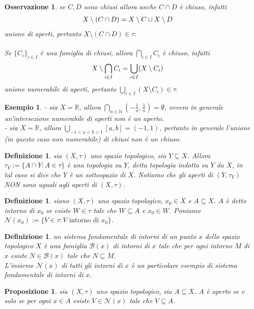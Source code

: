 \documentclass[oneside, 11pt]{amsbook}
\newcommand{\0}{{(0)}}
\newcommand{\3}{{(3)}}
\theoremstyle{colonplain}
\newtheorem{prop}[thm]{Proposizione}
\theoremstyle{colondefinition}
\newtheorem{defn}[thm]{Definizione}
\newtheorem{ex}[thm]{Esempio}
\theoremstyle{colonremark}
\newtheorem{rmk}[thm]{Osservazione}
\numberwithin{equation}{chapter}
\begin{document}
\begin{rmk}
se $C, D$ sono chiusi allora anche $C \cap D$ è chiuso, infatti
\begin{align}
    X \setminus (C \cap D) = X \setminus C \cup X \setminus D \notag
\end{align}
unione di aperti, pertanto $X \setminus (C \cap D) \in \tau$. \\ \\
Se $\{ C_i \}_{i \in I}$ è una famiglia di chiusi, allora $\bigcap_{i \in I} C_i$ è chiuso, infatti
\begin{align}
    X \setminus \bigcap_{i \in I} C_i = \bigcup_{i \in I} (X \setminus C_i) \notag
\end{align}
unione numerabile di aperti, pertanto $\bigcup_{i \in I} (X \setminus C_i) \in \tau$.
\end{rmk}
\begin{ex} - sia $X = \mathbb{R}$, allora $\bigcap_{n \in \mathbb{N}} \left(-\frac{1}{n}, \frac{1}{n}\right) = \emptyset$, ovvero in generale un'intersezione numerabile di aperti non è un aperto. \\
- sia $X = \mathbb{R}$, allora $\bigcup_{-1 < a < b < 1} [a, b] = (-1, 1)$, pertanto in generale l'unione (in questo caso non numerabile) di chiusi non è un chiuso.
\end{ex}
\begin{defn}
sia $(X, \tau)$ uno spazio topologico, sia $Y \subseteq X$. Allora $\tau_Y := \{ A \cap Y : A \in \tau \}$ è una topologia su $Y$, detta \textit{topologia indotta} su $Y$ da $X$, in tal caso si dice che $Y$ è un \textit{sottospazio} di $X$. Notiamo che gli aperti di $(Y, \tau_Y)$ NON sono uguali agli aperti di $(X, \tau)$.
\end{defn}
\begin{defn}
siano $(X, \tau)$ uno spazio topologico, $x_0 \in X$ e $A \subseteq X$. $A$ è detto \textit{intorno} di $x_0$ se esiste $W \in \tau$ tale che $W \subseteq A$ e $x_0 \in W$. Poniamo $\mathcal{N}(x_0) := \{ V \in \tau : V \text{ intorno di } x_0 \}$.
\end{defn}
\begin{defn}
un \textit{sistema fondamentale di intorni di un punto} $x$ dello spazio topologico $X$ è una famiglia $\mathcal{B}(x)$ di intorni di $x$ tale che per ogni intorno $M$ di $x$ esiste $N \in \mathcal{B}(x)$ tale che $N \subseteq M$. \\
L'insieme $\mathcal{N}(x)$ di tutti gli intorni di $x$ è un particolare esempio di sistema fondamentale di intorni di $x$.
\end{defn}
\begin{prop}\label{CarattAperti}
sia $(X, \tau)$ uno spazio topologico, sia $A \subseteq X$. $A$ è aperto se e solo se per ogni $x \in A$ esiste $V \in \mathcal{N}(x)$ tale che $V \subseteq A$.
\end{prop}
\end{document}
